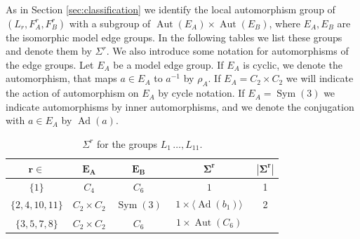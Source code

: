\documentclass[dvipsnames]{article}
\theoremstyle{definition}
\theoremstyle{remark}
\DeclareMathOperator{\Sym}{Sym}
\DeclareMathOperator{\Aut}{Aut}
\DeclareMathOperator{\Ad}{Ad}
\begin{document}
    As in Section \ref{sec:classification} we identify the local automorphism group of $(L_r, F_A^r, F_B^r)$ with a subgroup of $\Aut(E_A) \times \Aut(E_B)$, where $E_A,E_B$ are the isomorphic model edge groups.
    In the following tables we list these groups and denote them by $\Sigma^r$.
    We also introduce some notation for automorphisms of the edge groups. Let $E_A$ be a model edge group. If $E_A$ is cyclic, we denote the automorphism, that maps $a\in E_A$ to $a^{-1}$ by $\rho_A$.
    If $E_A=C_2\times C_2$ we will indicate the action of automorphism on $E_A$ by cycle notation. If $E_A = \Sym(3)$ we indicate automorphisms by inner automorphisms, and we denote the conjugation with $a\in E_A$ by $\Ad(a)$.

    \begin{longtable}{ |c|c|c|c|c|}
    \caption{$\Sigma^r$ for the groups $L_1\, \dots, L_{11}$.}
    \label{tbl:sigmasQ}\\
    \hline
    $\boldsymbol{r \in}$
    & $\boldsymbol{E_A}$
    & $\boldsymbol{E_B}$
    & $\boldsymbol{\Sigma^r}$
    &$|\boldsymbol{\Sigma^r}|$ \\
    \hline
    $\{1\}$
    &
    $C_4$
    &
    $C_6$
    &
    \begin{minipage}{3.5cm}
        {
        \vspace{-2.5mm}
        \begin{align*}
            1
        \end{align*}
        \vspace{-5mm}
        }
    \end{minipage}
    & 1 \\
    \hline
    $\{2,4,10,11\}$
    &
    $C_2\times C_2$
    &
    $\Sym(3)$
    &
    \begin{minipage}{3.5cm}
        {
        \vspace{-2.5mm}
        \begin{align*}
                1 \times \langle \Ad(b_1) \rangle
        \end{align*}
        \vspace{-5mm}
        }
    \end{minipage}
    & 2\\
    \hline
    $\{3,5,7,8\}$
    &
    $C_2\times C_2$
    &
    $C_6$
    &
    \begin{minipage}{3.5cm}
        {
        \vspace{-2.5mm}
        \begin{align*}
            1 \times \Aut(C_6)
        \end{align*}
}
\end{minipage}
\end{longtable}
\end{document}
